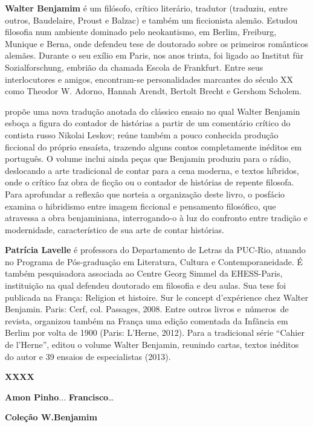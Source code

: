 
\textbf{Walter Benjamim} é um filósofo, crítico literário, tradutor (traduziu, entre outros, Baudelaire, Proust e Balzac) e também um ficcionista alemão. Estudou filosofia num ambiente dominado pelo neokantismo, em Berlim, Freiburg, Munique e Berna, onde defendeu tese de doutorado sobre os primeiros românticos alemães. Durante o seu exílio em Paris, nos anos trinta, foi ligado ao Institut für Sozialforschung, embrião da chamada Escola de Frankfurt. Entre seus interlocutores e amigos, encontram-se personalidades marcantes do século XX como Theodor W. Adorno, Hannah Arendt, Bertolt Brecht e Gershom Scholem.

\textbf{\titulo} propõe uma nova tradução anotada do clássico ensaio no qual Walter Benjamin esboça a figura do contador de histórias a partir de um comentário crítico do contista russo Nikolai Leskov; reúne também a pouco conhecida produção ficcional do próprio ensaísta, trazendo alguns contos completamente inéditos em português. O volume inclui ainda peças que Benjamin produziu para o rádio, deslocando a arte tradicional de contar para a cena moderna, e textos híbridos, onde o crítico faz obra de ficção ou o contador de histórias de repente filosofa. Para aprofundar a reflexão que norteia a organização deste livro, o posfácio examina o hibridismo entre imagem ficcional e pensamento filosófico, que atravessa a obra benjaminiana, interrogando-o à luz do confronto entre tradição e modernidade, característico de sua arte de contar histórias.

\textbf{Patrícia Lavelle} é professora do Departamento de Letras da PUC-Rio, atuando no Programa de Pós-graduação em Literatura, Cultura e Contemporaneidade. É também pesquisadora associada ao Centre Georg Simmel da EHESS-Paris,  instituição na qual defendeu doutorado em filosofia e deu aulas. Sua tese foi publicada na França: Religion et histoire. Sur le concept d’expérience chez Walter Benjamin. Paris: Cerf, col. Passages, 2008. Entre outros livros e números de revista, organizou também na França uma edição comentada da Infância em Berlim por volta de 1900 (Paris: L’Herne, 2012). Para a tradicional série “Cahier de l’Herne”, editou o volume Walter Benjamin, reunindo cartas, textos inéditos do autor e 39 ensaios de especialistas (2013). 

\textbf{XXXX} \lipsum[4]

\textbf{Amon Pinho}...
\textbf{Francisco}…

\textbf{Coleção W.Benjamim} \lipsum[6]


